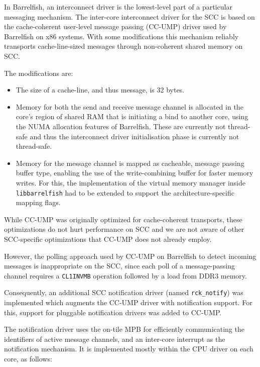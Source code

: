 \documentclass[a4paper,twoside]{report} %
\begin{document}
In Barrelfish, an interconnect driver is the lowest-level part of a
particular messaging mechanism. The inter-core interconnect driver for
the SCC is based on the cache-coherent user-level message passing
(CC-UMP) driver used by Barrelfish on x86 systems. With some
modifications this mechanism reliably transports cache-line-sized
messages through non-coherent shared memory on SCC.

The modifications are:
\begin{itemize}
\item The size of a cache-line, and thus message, is 32 bytes.

\item Memory for both the send and receive message channel is
  allocated in the core's region of shared RAM that is initiating a
  bind to another core, using the NUMA allocation features of
  Barrelfish. These are currently not thread-safe and thus the
  interconnect driver initialisation phase is currently not
  thread-safe.

\item Memory for the message channel is mapped as cacheable, message
  passing buffer type, enabling the use of the write-combining buffer
  for faster memory writes. For this, the implementation of the
  virtual memory manager inside \texttt{libbarrelfish} had to be
  extended to support the architecture-specific mapping flags.
\end{itemize}

While CC-UMP was originally optimized for cache-coherent transports, these
optimizations do not hurt performance on SCC and we are not aware of other
SCC-specific optimizations that CC-UMP does not already employ.

However, the polling approach used by CC-UMP on Barrelfish to detect incoming
messages is inappropriate on the SCC, since each poll of a message-passing
channel requires a \texttt{CL1INVMB} operation followed by a load from DDR3
memory.

Consequently, an additional SCC notification driver (named
\texttt{rck\_notify}) was implemented which augments the CC-UMP driver
with notification support. For this, support for pluggable
notification drivers was added to CC-UMP.

The notification driver uses the on-tile MPB for efficiently
communicating the identifiers of active message channels, and
an inter-core interrupt as the notification mechanism. It is implemented
mostly within the CPU driver on each core, as follows: 
\end{document}

